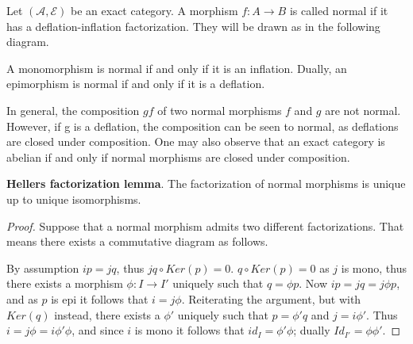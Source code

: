     \begin{definition}
        Let $(\mathcal{A},\mathcal{E})$ be an exact category. A morphism $f:A\rightarrow B$ is called normal if it has a deflation-inflation factorization. They will be drawn as in the following diagram.
        \begin{center}
        \end{center}
    \end{definition}

    \begin{remark}
        A monomorphism is normal if and only if it is an inflation. Dually, an epimorphism is normal if and only if it is a deflation.
    \end{remark}

    \begin{remark}
        In general, the composition $gf$ of two normal morphisms $f$ and $g$ are not normal. However, if g is a deflation, the composition can be seen to normal, as deflations are closed under composition. One may also observe that an exact category is abelian if and only if normal morphisms are closed under composition.
    \end{remark}

    \begin{lemma}
        \textbf{Hellers factorization lemma}. The factorization of normal morphisms is unique up to unique isomorphisms.
    \end{lemma}

    \begin{proof}
        Suppose that a normal morphism admits two different factorizations. That means there exists a commutative diagram as follows.
        \begin{center}
        \end{center}
        By assumption $ip=jq$, thus $jq\circ Ker(p)=0$. $q\circ Ker(p)=0$ as $j$ is mono, thus there exists a morphism $\phi:I\rightarrow I'$ uniquely such that $q=\phi p$. Now $ip=jq=j\phi p$, and as $p$ is epi it follows that $i=j\phi$. Reiterating the argument, but with $Ker(q)$ instead, there exists a $\phi '$ uniquely such that $p = \phi 'q$ and $j=i\phi '$. Thus $i=j\phi = i\phi '\phi$, and since $i$ is mono it follows that $id_I=\phi '\phi$; dually $Id_{I'}=\phi\phi '$.
    \end{proof}

